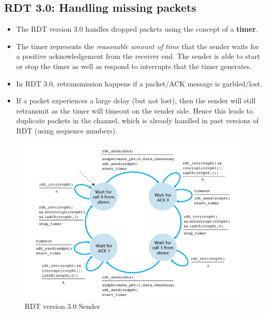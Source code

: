 \documentclass{article}
\theoremstyle{plain}
\theoremstyle{definition}
\begin{document}
\subsection{RDT 3.0: Handling missing packets}
\begin{itemize}
    \item The RDT version 3.0 handles dropped packets using the concept of a \textbf{timer}.
    
    \item The timer represents the \textit{reasonable amount of time} that the sender waits for a positive acknowledgement from the receiver end. The sender is able to start or stop the timer as well as respond to interrupts that the timer generates.
    
    \item In RDT 3.0, retransmission happens if a packet/ACK message is garbled/lost. 
    
    \item If a packet experiences a large delay (but not lost), then the sender will still retransmit as the timer will timeout on the sender side. Hence this leads to duplicate packets in the channel, which is already handled in past versions of RDT (using sequence numbers).  
\end{itemize}

\begin{figure}[!h]
    \centering
    \includegraphics[scale=0.8]{rdt3s.png}
    \caption{RDT version 3.0 Sender}
    \label{fig:my_label_9}
\end{figure}
\end{document}
